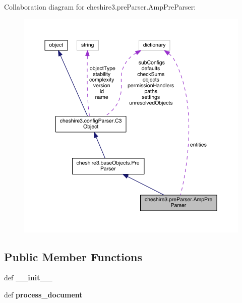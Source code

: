 Collaboration diagram for cheshire3.\-pre\-Parser.\-Amp\-Pre\-Parser\-:
\nopagebreak
\begin{figure}[H]
\begin{center}
\leavevmode
\includegraphics[width=350pt]{classcheshire3_1_1pre_parser_1_1_amp_pre_parser__coll__graph}
\end{center}
\end{figure}
\subsection*{Public Member Functions}
\begin{DoxyCompactItemize}
\item 
\hypertarget{classcheshire3_1_1pre_parser_1_1_amp_pre_parser_abeb55b4673765f37180afc7b1df1a29b}{def {\bfseries \-\_\-\-\_\-init\-\_\-\-\_\-}}\label{classcheshire3_1_1pre_parser_1_1_amp_pre_parser_abeb55b4673765f37180afc7b1df1a29b}

\item 
\hypertarget{classcheshire3_1_1pre_parser_1_1_amp_pre_parser_a2fa1429a2e1784fb65f9c488872e2c43}{def {\bfseries process\-\_\-document}}\label{classcheshire3_1_1pre_parser_1_1_amp_pre_parser_a2fa1429a2e1784fb65f9c488872e2c43}

\end{DoxyCompactItemize}
